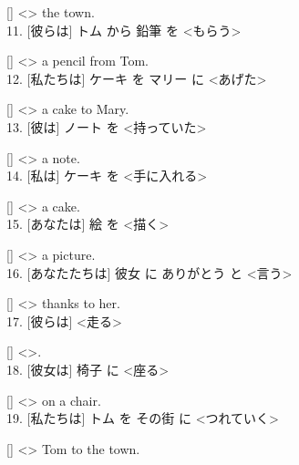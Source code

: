 \documentclass[uplatex,
paper=a4,
fontsize=18pt,
jafontsize=16pt,
number_of_lines=30,
line_length=30zh,
baselineskip=25pt,
]{jlreq}
\begin{document}
  [\hspace{3em}] <\hspace{3em}> the town.
\\

11.  [彼らは] トム から 鉛筆 を <もらう>

  [\hspace{3em}] <\hspace{3em}> a pencil from Tom.
\\

12.  [私たちは] ケーキ を マリー に <あげた>

  [\hspace{3em}] <\hspace{3em}> a cake to Mary.
\\

13.  [彼は] ノート を <持っていた>

  [\hspace{3em}] <\hspace{3em}> a note.
\\

14.  [私は] ケーキ を <手に入れる>

  [\hspace{3em}] <\hspace{3em}> a cake.
\\

15.  [あなたは] 絵 を <描く>

  [\hspace{3em}] <\hspace{3em}> a picture.
\\

16.  [あなたたちは] 彼女 に ありがとう と <言う>

  [\hspace{3em}] <\hspace{3em}> thanks to her.
\\

17.  [彼らは] <走る>

  [\hspace{3em}] <\hspace{3em}>.
\\

18.  [彼女は] 椅子 に <座る>

  [\hspace{3em}] <\hspace{3em}> on a chair.
\\

19.  [私たちは] トム を その街 に <つれていく>

  [\hspace{3em}] <\hspace{3em}> Tom to the town.
\\
\end{document}
